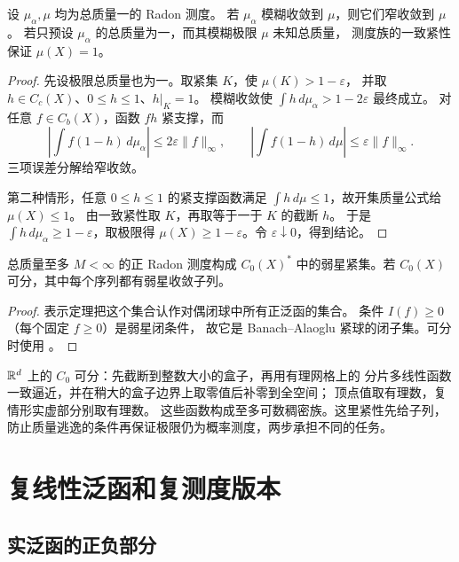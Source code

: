 \begin{proposition}\label{prop:vague-probability-narrow}
设 \(\mu_\alpha,\mu\) 均为总质量一的 Radon 测度。
若 \(\mu_\alpha\) 模糊收敛到 \(\mu\)，则它们窄收敛到 \(\mu\)。
若只预设 \(\mu_\alpha\) 的总质量为一，而其模糊极限 \(\mu\) 未知总质量，
测度族的一致紧性保证 \(\mu(X)=1\)。
\end{proposition}
\begin{proof}
先设极限总质量也为一。取紧集 \(K\)，使 \(\mu(K)>1-\varepsilon\)，
并取 \(h\in C_c(X)\)、\(0\le h\le1\)、\(h|_K=1\)。
模糊收敛使 \(\int h\,d\mu_\alpha>1-2\varepsilon\) 最终成立。
对任意 \(f\in C_b(X)\)，函数 \(fh\) 紧支撑，而
\[
 \left|\int f(1-h)\,d\mu_\alpha\right|\le2\varepsilon\|f\|_\infty,\qquad
 \left|\int f(1-h)\,d\mu\right|\le\varepsilon\|f\|_\infty.
\]
三项误差分解给窄收敛。

第二种情形，任意 \(0\le h\le1\) 的紧支撑函数满足
\(\int h\,d\mu\le1\)，故开集质量公式给 \(\mu(X)\le1\)。
由一致紧性取 \(K\)，再取等于一于 \(K\) 的截断 \(h\)。
于是 \(\int h\,d\mu_\alpha\ge1-\varepsilon\)，取极限得
\(\mu(X)\ge1-\varepsilon\)。令 \(\varepsilon\downarrow0\)，得到结论。
\end{proof}

\begin{proposition}\label{prop:radon-positive-ball-compact}
总质量至多 \(M<\infty\) 的正 Radon 测度构成 \(C_0(X)^*\)
中的弱星紧集。若 \(C_0(X)\) 可分，其中每个序列都有弱星收敛子列。
\end{proposition}
\begin{proof}
表示定理把这个集合认作对偶闭球中所有正泛函的集合。
条件 \(I(f)\ge0\)（每个固定 \(f\ge0\)）是弱星闭条件，
故它是 Banach--Alaoglu 紧球的闭子集。可分时使用
。
\end{proof}

\(\mathbb{R}^d\) 上的 \(C_0\) 可分：先截断到整数大小的盒子，再用有理网格上的
分片多线性函数一致逼近，并在稍大的盒子边界上取零值后补零到全空间；
顶点值取有理数，复情形实虚部分别取有理数。
这些函数构成至多可数稠密族。这里紧性先给子列，
防止质量逃逸的条件再保证极限仍为概率测度，两步承担不同的任务。

\section{复线性泛函和复测度版本}
\label{sec:complex-riesz-markov}

\subsection{实泛函的正负部分}

